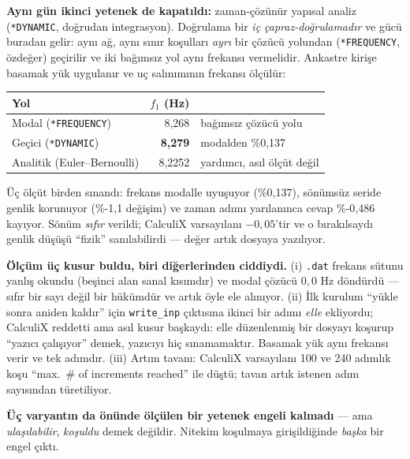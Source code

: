 \documentclass[11pt,a4paper]{article}
\begin{document}
\begin{description}
        \noindent \textbf{Aynı gün ikinci yetenek de kapatıldı:} zaman-çözünür
        yapısal analiz (\texttt{*DYNAMIC}, doğrudan integrasyon). Doğrulama bir
\emph{iç çapraz-doğrulamadır} ve gücü buradan gelir: aynı ağ, aynı sınır
        koşulları \emph{ayrı} bir çözücü yolundan (\texttt{*FREQUENCY},
        özdeğer) geçirilir ve iki bağımsız yol aynı frekansı vermelidir.
        Ankastre kirişe basamak yük uygulanır ve uç salınımının frekansı
        ölçülür:

\begin{center}\footnotesize
\begin{tabular}{@{}lrl@{}}
\toprule
Yol & $f_1$ (Hz) & \\
\midrule
Modal (\texttt{*FREQUENCY}) & 8{,}268 & bağımsız çözücü yolu \\
Geçici (\texttt{*DYNAMIC}) & \textbf{8{,}279} & modalden \%0{,}137 \\
Analitik (Euler--Bernoulli) & 8{,}2252 & yardımcı, asıl ölçüt değil \\
\bottomrule
\end{tabular}
\end{center}

        \noindent Üç ölçüt birden sınandı: frekans modalle uyuşuyor
        (\%0{,}137), sönümsüz seride genlik korunuyor
        (\%-1{,}1 değişim) ve zaman adımı yarılanınca cevap
        \%-0{,}486 kayıyor. Sönüm \emph{sıfır} verildi; CalculiX
        varsayılanı $-0{,}05$'tir ve o bırakılsaydı genlik düşüşü ``fizik''
        sanılabilirdi --- değer artık dosyaya yazılıyor.

        \textbf{Ölçüm üç kusur buldu, biri diğerlerinden ciddiydi.} (i)
        \texttt{.dat} frekans sütunu yanlış okundu (beşinci alan sanal
        kısımdır) ve modal çözücü $0{,}0$ Hz döndürdü --- sıfır bir sayı değil
        bir hükümdür ve artık öyle ele alınıyor. (ii) İlk kurulum ``yükle
        sonra aniden kaldır'' için \texttt{write\_inp} çıktısına ikinci bir adımı
        \emph{elle} ekliyordu; CalculiX reddetti ama asıl kusur başkaydı:
        elle düzenlenmiş bir dosyayı koşurup ``yazıcı çalışıyor'' demek,
        yazıcıyı hiç sınamamaktır. Basamak yük aynı frekansı verir ve tek
        adımdır. (iii) Artım tavanı: CalculiX varsayılanı 100 ve 240 adımlık
        koşu ``max.\ \# of increments reached'' ile düştü; tavan artık
        istenen adım sayısından türetiliyor.

        \noindent \textbf{Üç varyantın da önünde ölçülen bir yetenek engeli
        kalmadı} --- ama \emph{ulaşılabilir}, \emph{koşuldu} demek değildir.
        Nitekim koşulmaya girişildiğinde \emph{başka} bir engel çıktı.


\end{description}
\end{document}

